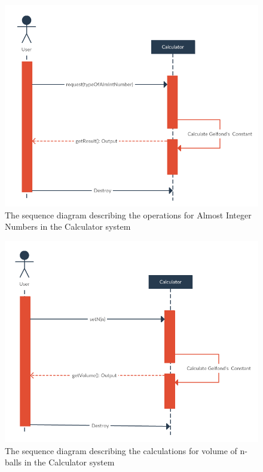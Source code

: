 \documentclass{article}
\begin{document}
\begin{center}
    \begin{figure}[h!]
      \includegraphics[scale=0.4]{images/n4-sequence-1.png}
      \caption{The sequence diagram describing the operations for Almost Integer Numbers in the Calculator system}
    \end{figure}
\end{center}

\begin{center}
    \begin{figure}[h!]
      \includegraphics[scale=0.4]{images/n4-sequence-2.png}
      \caption{The sequence diagram describing the calculations for volume of n-balls in the Calculator system}
    \end{figure}
\end{center}
\end{document}

